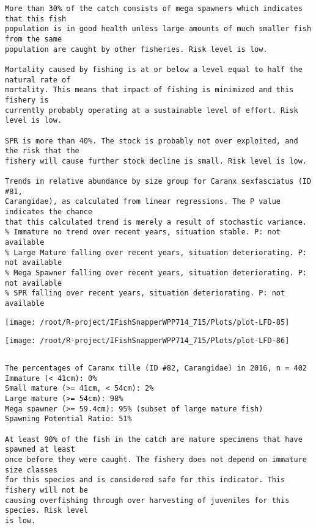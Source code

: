 \documentclass{report}\usepackage[]{graphicx}\usepackage[]{color}
\makeatletter
\def\maxwidth{ %
  \ifdim\Gin@nat@width>\linewidth
    \linewidth
  \else
    \Gin@nat@width
  \fi
}
\newenvironment{kframe}{%
 \def\at@end@of@kframe{}%
 \ifinner\ifhmode%
  \def\at@end@of@kframe{\end{minipage}}%
  \begin{minipage}{\columnwidth}%
 \fi\fi%
 \def\FrameCommand##1{\hskip\@totalleftmargin \hskip-\fboxsep
 \colorbox{shadecolor}{##1}\hskip-\fboxsep
     \hskip-\linewidth \hskip-\@totalleftmargin \hskip\columnwidth}%
 \MakeFramed {\advance\hsize-\width
   \@totalleftmargin\z@ \linewidth\hsize
   \@setminipage}}%
 {\par\unskip\endMakeFramed%
 \at@end@of@kframe}
\newenvironment{knitrout}{}{} %
\makeatother
\begin{document}
\begin{knitrout}
\begin{kframe}
\begin{verbatim}
More than 30% of the catch consists of mega spawners which indicates that this fish
population is in good health unless large amounts of much smaller fish from the same
population are caught by other fisheries. Risk level is low.
 
Mortality caused by fishing is at or below a level equal to half the natural rate of
mortality. This means that impact of fishing is minimized and this fishery is
currently probably operating at a sustainable level of effort. Risk level is low.
 
SPR is more than 40%. The stock is probably not over exploited, and the risk that the
fishery will cause further stock decline is small. Risk level is low.
 
Trends in relative abundance by size group for Caranx sexfasciatus (ID #81,
Carangidae), as calculated from linear regressions. The P value indicates the chance
that this calculated trend is merely a result of stochastic variance.
% Immature no trend over recent years, situation stable. P: not available
% Large Mature falling over recent years, situation deteriorating. P: not available
% Mega Spawner falling over recent years, situation deteriorating. P: not available
% SPR falling over recent years, situation deteriorating. P: not available
\end{verbatim}
\end{kframe}
\texttt{[image: /root/R-project/IFishSnapperWPP714\_715/Plots/plot-LFD-85]} 

\texttt{[image: /root/R-project/IFishSnapperWPP714\_715/Plots/plot-LFD-86]} 
\begin{kframe}\begin{verbatim}
\end{verbatim}
\end{kframe}
\clearpage
\newpage
\begin{kframe}\begin{verbatim}The percentages of Caranx tille (ID #82, Carangidae) in 2016, n = 402
Immature (< 41cm): 0%
Small mature (>= 41cm, < 54cm): 2%
Large mature (>= 54cm): 98%
Mega spawner (>= 59.4cm): 95% (subset of large mature fish)
Spawning Potential Ratio: 51%
 
At least 90% of the fish in the catch are mature specimens that have spawned at least
once before they were caught. The fishery does not depend on immature size classes
for this species and is considered safe for this indicator. This fishery will not be
causing overfishing through over harvesting of juveniles for this species. Risk level
is low.


\end{verbatim}
\end{kframe}
\end{knitrout}
\end{document}
